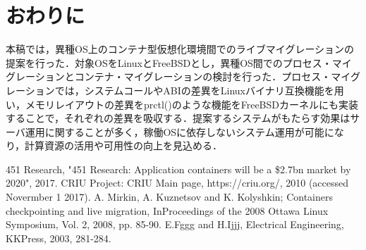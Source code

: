 \documentclass[11pt]{jarticle}
\begin{document}
\section{おわりに}
本稿では，異種OS上のコンテナ型仮想化環境間でのライブマイグレーションの提案を行った．対象OSをLinuxとFreeBSDとし，異種OS間でのプロセス・マイグレーションとコンテナ・マイグレーションの検討を行った．プロセス・マイグレーションでは，システムコールやABIの差異をLinuxバイナリ互換機能を用い，メモリレイアウトの差異をprctl()のような機能をFreeBSDカーネルにも実装することで，それぞれの差異を吸収する．提案するシステムがもたらす効果はサーバ運用に関することが多く，稼働OSに依存しないシステム運用が可能になり，計算資源の活用や可用性の向上を見込める．



\begin{thebibliography}{99}
	451 Research, "451 Research: Application containers will be a \$2.7bn market by 2020", 2017.
	CRIU Project: CRIU Main page, https://criu.org/, 2010 (accessed Novermber 1 2017).
	A. Mirkin, A. Kuznetsov and K. Kolyshkin; Containers checkpointing and live migration, InProceedings of the 2008 Ottawa Linux Symposium, Vol. 2, 2008, pp. 85-90.
	E.Fggg and H.Ijjj, Electrical Engineering, KKPress, 2003, 281-284.
\end{thebibliography}
\end{document}
